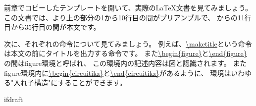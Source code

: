 		前章でコピーしたテンプレートを開いて、実際の\LaTeX 文書を見てみましょう。
		この文書では、\url{}より上の部分の1から10行目の間がプリアンブルで、
		\url{}から\url{}の11行目から35行目の間が本文です。
        
        次に、それぞれの命令について見てみましょう。
        例えば、\url{\maketitle}という命令は本文の前にタイトルを出力する命令です。
        また\url{\begin{figure}}と\url{\end{figure}}の間はfigure環境と呼ばれ、
        この環境内の記述内容は図と認識されます。
        またfigure環境内に\url{\begin{circuitikz}}と\url{\end{circuitikz}}があるように、
        環境はいわゆる"入れ子構造"にすることができます。


		\expandafter\ifx\csname ifdraft\endcsname\relax
		
		\fi